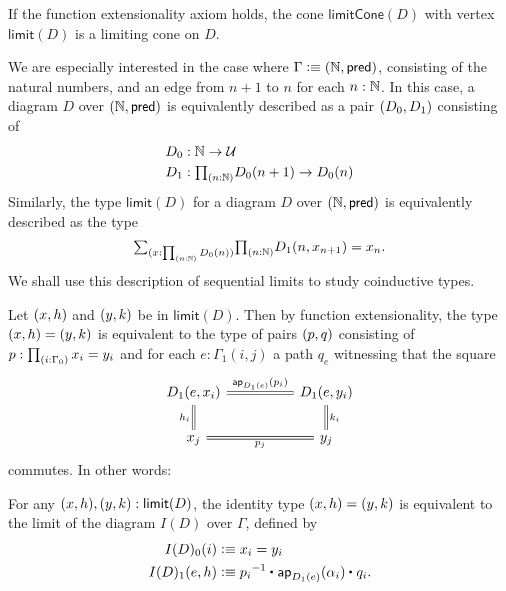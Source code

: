 \begin{lem}
If the function extensionality axiom holds, the cone $\mathsf{limitCone}(D)$ 
with vertex $\mathsf{limit}(D)$ is a limiting cone on $D$.
\end{lem}

We are especially interested in the case where 
$\Gamma\vcentcolon\equiv{\mathopen{}(\ensuremath{\mathbb{N}},\mathsf{pred})\mathclose{}}$, consisting of the natural numbers, 
and an edge from $n+1$ to $n$ for each $n:\mathbb{N}$. 
In this case, a diagram $D$ over ${\mathopen{}(\mathbb{N},\mathsf{pred})\mathclose{}}$ is equivalently
described as a pair ${\mathopen{}(D_0,D_1)\mathclose{}}$ consisting of
\begin{align*}
D_0 & : \N\to\UU \\
D_1 & : \prd{n:\N} D_0(n+1)\to D_0(n)
\end{align*}
Similarly, the type $\mathsf{limit}(D)$ for a diagram $D$ over
${\mathopen{}(\mathbb{N},\mathsf{pred})\mathclose{}}$ is equivalently described as the type
\begin{equation}\label{eq:sequential_limit}
\sm{x:\prd{n:\N}D_0(n)}\prd{n:\N}D_1(n,x_{n+1})=x_n.
\end{equation}
We shall use this description of sequential limits to study coinductive types.

Let ${\mathopen{}(x,h)\mathclose{}}$ and ${\mathopen{}(y,k)\mathclose{}}$ be in $\mathsf{limit}(D)$.
Then by function extensionality, the type ${\mathopen{}(x,h)\mathclose{}}={\mathopen{}(y,k)\mathclose{}}$ 
is equivalent to the type of pairs ${\mathopen{}(p,q)\mathclose{}}$ consisting of
$p : \prd{i:\Gamma_0} x_i=y_i$ and for each $e:\Gamma_1(i,j)$ a path
$q_e$ witnessing that the square
\begin{equation*}
\begin{tikzcd}[column sep=huge]
D_1(e,x_i) \arrow[r,equals,"\mapfunc{D_1(e)}(p_i)"] \arrow[d,equals,swap,"h_i"] & D_1(e,y_i) \arrow[d,equals,"k_i"] \\
x_j \arrow[r,equals,swap,"p_j"] & y_j
\end{tikzcd}
\end{equation*}
commutes. In other words:

\begin{lem}\label{lem:id_limit}
For any ${\mathopen{}(x,h)\mathclose{}},{\mathopen{}(y,k)\mathclose{}}:\mathsf{limit}(D)$, the identity type
${\mathopen{}(x,h)\mathclose{}}={\mathopen{}(y,k)\mathclose{}}$ is equivalent to the limit of the diagram $I(D)$ over
$\Gamma$, defined by
\begin{align*}
I(D)_0(i) & \defeq x_i=y_i \\
I(D)_1(e,h) & \defeq \ct{\opp{p_i}}{\mapfunc{D_1(e)}(\alpha_i)}{q_i}.
\end{align*}
\end{lem}

